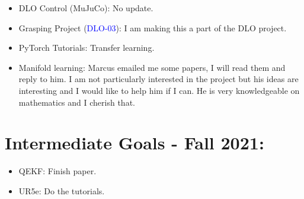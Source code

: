\documentclass[11pt]{article}
\begin{document}
\begin{itemize}
    \item DLO Control (MuJuCo): No update.

    \item Grasping Project (\textcolor{blue}{DLO-03}): I am making this a part of the DLO project.
    \item PyTorch Tutorials: Transfer learning.
    \item Manifold learning: Marcus emailed me some papers, I will read them
    and reply to him. I am not particularly interested in the project but his
    ideas are interesting and I would like to help him if I can. He is very
    knowledgeable on mathematics and I cherish that.

  \end{itemize}

\section{Intermediate Goals - Fall 2021:}
\begin{itemize}
      \item QEKF: Finish paper.
      \item UR5e: Do the tutorials.
\end{itemize}

\newpage

\newpage


\end{document}
